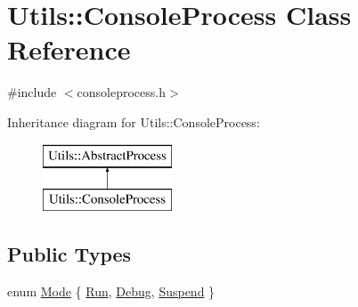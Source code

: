 \hypertarget{class_utils_1_1_console_process}{\section{\-Utils\-:\-:\-Console\-Process \-Class \-Reference}
\label{class_utils_1_1_console_process}
}


{\ttfamily \#include $<$consoleprocess.\-h$>$}

\-Inheritance diagram for \-Utils\-:\-:\-Console\-Process\-:\begin{figure}[H]
\begin{center}
\leavevmode
\includegraphics[height=2.000000cm]{class_utils_1_1_console_process}
\end{center}
\end{figure}
\subsection*{\-Public \-Types}
\begin{DoxyCompactItemize}
\item 
enum \hyperlink{class_utils_1_1_console_process_a6c86a313e133158cd77772a207426e41}{\-Mode} \{ \hyperlink{class_utils_1_1_console_process_a6c86a313e133158cd77772a207426e41a14b3f49a287137fd8ef08013e02fc674}{\-Run}, 
\hyperlink{class_utils_1_1_console_process_a6c86a313e133158cd77772a207426e41a231b80c70550ea74c6c61d7fe701db68}{\-Debug}, 
\hyperlink{class_utils_1_1_console_process_a6c86a313e133158cd77772a207426e41a41487da85390b78d6a83eb3ddd0d0625}{\-Suspend}
 \}
\end{DoxyCompactItemize}
